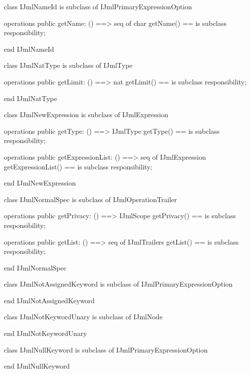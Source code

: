 \begin{vdm_al}
class IJmlNameId
 is subclass of IJmlPrimaryExpressionOption

operations
  public getName: () ==> seq of char
  getName() == is subclass responsibility;

end IJmlNameId
\end{vdm_al}

\begin{vdm_al}
class IJmlNatType
 is subclass of IJmlType

operations
  public getLimit: () ==> nat
  getLimit() == is subclass responsibility;

end IJmlNatType
\end{vdm_al}

\begin{vdm_al}
class IJmlNewExpression
 is subclass of IJmlExpression

operations
  public getType: () ==> IJmlType
  getType() == is subclass responsibility;

operations
  public getExpressionList: () ==> seq of IJmlExpression
  getExpressionList() == is subclass responsibility;

end IJmlNewExpression
\end{vdm_al}

\begin{vdm_al}
class IJmlNormalSpec
 is subclass of IJmlOperationTrailer

operations
  public getPrivacy: () ==> IJmlScope
  getPrivacy() == is subclass responsibility;

operations
  public getList: () ==> seq of IJmlTrailers
  getList() == is subclass responsibility;

end IJmlNormalSpec
\end{vdm_al}

\begin{vdm_al}
class IJmlNotAssignedKeyword
 is subclass of IJmlPrimaryExpressionOption

end IJmlNotAssignedKeyword
\end{vdm_al}

\begin{vdm_al}
class IJmlNotKeywordUnary
 is subclass of IJmlNode

end IJmlNotKeywordUnary
\end{vdm_al}

\begin{vdm_al}
class IJmlNullKeyword
 is subclass of IJmlPrimaryExpressionOption

end IJmlNullKeyword
\end{vdm_al}

